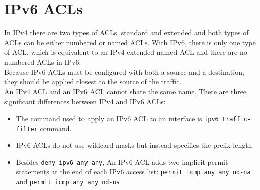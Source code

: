 \section{IPv6 ACLs}
In IPv4 there are two types of ACLs, standard and extended and both types of ACLs can be either numbered or named ACLs. With IPv6, there is only one type of ACL, which is equivalent to an IPv4 extended named ACL and there are no numbered ACLs in IPv6. \\
Because IPv6 ACLs must be configured with both a source and a destination, they should be applied closest to the source of the traffic. \\
An IPv4 ACL and an IPv6 ACL cannot share the same name. There are three significant differences between IPv4 and IPv6 ACLs:
	\begin{itemize}
	\item The command used to apply an IPv6 ACL to an interface is \texttt{ipv6 traffic-filter} command.
	\item IPv6 ACLs do not use wildcard masks but instead specifies the prefix-length
	\item Besides \texttt{deny ipv6 any any}, An IPv6 ACL adds two implicit permit statements at the end of each IPv6 access list: \texttt{permit icmp any any nd-na} and \texttt{permit icmp any any nd-ns}
	\end{itemize}
